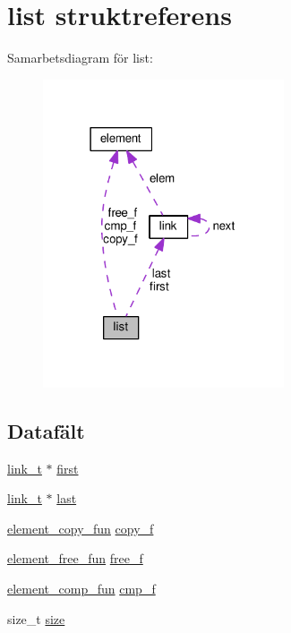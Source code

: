 \hypertarget{structlist}{}\section{list struktreferens}
\label{structlist}


Samarbetsdiagram för list\+:\nopagebreak
\begin{figure}[H]
\begin{center}
\leavevmode
\includegraphics[width=202pt]{structlist__coll__graph}
\end{center}
\end{figure}
\subsection*{Datafält}
\begin{DoxyCompactItemize}
\item 
\hyperlink{list_8c_ab1a5f2fcda4f00dce92c82ebc30c4b3d}{link\+\_\+t} $\ast$ \hyperlink{structlist_a8b3138e762449dc038dfa560f02f5f96}{first}
\item 
\hyperlink{list_8c_ab1a5f2fcda4f00dce92c82ebc30c4b3d}{link\+\_\+t} $\ast$ \hyperlink{structlist_a05a1dc6800f93b4e20b872a397ab396f}{last}
\item 
\hyperlink{common_8h_a0ca91ee5ad428d2cb3161e07618bd21c}{element\+\_\+copy\+\_\+fun} \hyperlink{structlist_acd5def2fe519248ad24e10b426acd44f}{copy\+\_\+f}
\item 
\hyperlink{common_8h_a66551bc5a869ff55fd6e97cdf83f9e27}{element\+\_\+free\+\_\+fun} \hyperlink{structlist_a28ae85a352de920c1bcc353411bac5fe}{free\+\_\+f}
\item 
\hyperlink{common_8h_a1ae319bacbeb687146c87de665a96b35}{element\+\_\+comp\+\_\+fun} \hyperlink{structlist_a3e595459af1efe57e5929c7a48c1cb1c}{cmp\+\_\+f}
\item 
size\+\_\+t \hyperlink{structlist_ae581be90bd8eb7051528b61ad216de88}{size}
\end{DoxyCompactItemize}



